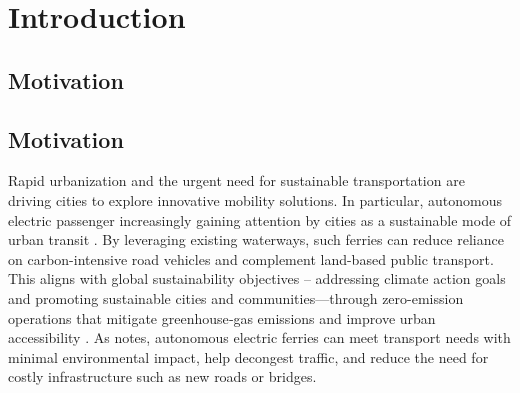 
\chapter{Introduction}


\section{Motivation}

\section{Motivation}

Rapid urbanization and the urgent need for sustainable transportation are driving cities to explore innovative mobility solutions. In particular, autonomous electric passenger increasingly gaining attention by cities as a sustainable mode of urban transit \citep{Alsos2024}. By leveraging existing waterways, such ferries can reduce reliance on carbon-intensive road vehicles and complement land-based public transport. 
This aligns with global sustainability objectives -- addressing climate action goals and promoting sustainable cities and communities—through zero-emission operations that mitigate greenhouse‐gas emissions and improve urban accessibility \citep{dnvAutonomousUrban}. 
As \citet{dnvAutonomousUrban} notes, autonomous electric ferries can meet transport needs with minimal environmental impact, help decongest traffic, and reduce the need for costly infrastructure such as new roads or bridges.


